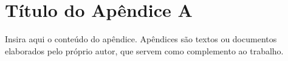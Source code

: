 
\section{Título do Apêndice A}
\label{apd:apendice-a}

Insira aqui o conteúdo do apêndice. Apêndices são textos ou documentos
elaborados pelo próprio autor, que servem como complemento ao trabalho.

